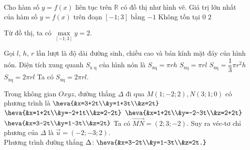 \begin{ex}%
\immini
{
Cho hàm số $y=f(x)$ liên tục trên $\mathbb{R}$ có đồ thị như hình vẽ. Giá trị lớn nhất của hàm số $y=f(x)$ trên đoạn $[-1;3]$ bằng
\choice
{$-1$}
{Không tồn tại}
{$0$}
{\True $2$}
}
{
}
\loigiai
{
Từ đồ thị, ta có $\max\limits_{[-1;3]} y=2$.
}
\end{ex}
\begin{ex}%
Gọi $l$, $h$, $r$ lần lượt là độ dài đường sinh, chiều cao và bán kính mặt đáy của hình nón. Diện tích xung quanh $S_{\text{x q}}$ của hình nón là
\choice
{$S_{\text{xq}}=\pi r h$}
{$S_{\text{xq}}=\pi r l$}
{$S_{\text{xq}}=\dfrac{1}{3}\pi r^2h$}
{\True $S_{\text{xq}}=2\pi r l$}
\loigiai
{
Ta có $S_{\text{xq}}=2\pi r l$.
}
\end{ex}

\begin{ex}%
Trong không gian $O x y z$, đường thẳng $\Delta$ đi qua $M(1;-2;2),N(3;1;0)$ có phương trình là
\choice
{$\heva{&x=3+2t\\&y=1+3t\\&z=2t}$}
{$\heva{&x=1+2t\\&y=-2+1t\\&z=2-2t}$}
{$\heva{&x=1+2t\\&y=-2-3t\\&z=2+2t}$}
{\True $\heva{&x=3-2t\\&y=1-3t\\&z=2t}$}
\loigiai
{
Ta có $\overrightarrow{MN}=(2;3;-2)$. Suy ra véc-tơ chỉ phương của $\Delta$ là $\overrightarrow{u}=(-2;-3;2)$.\\
Phương trình đường thẳng $\Delta\colon \heva{&x=3-2t\\&y=1-3t\\&z=2t.}$
}
\end{ex}

